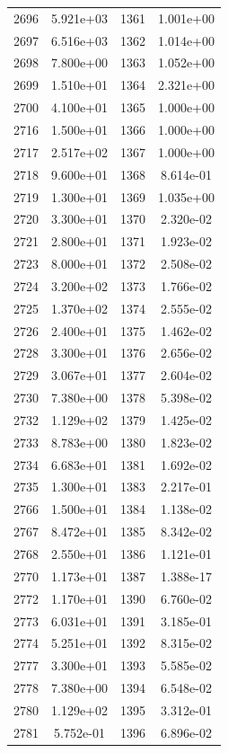 \documentclass[12pt]{article}
\begin{document}
\begin{longtable}{@{}cccc@{}}
2696 & 5.921e+03 & 1361 & 1.001e+00 \\
2697 & 6.516e+03 & 1362 & 1.014e+00 \\
2698 & 7.800e+00 & 1363 & 1.052e+00 \\
2699 & 1.510e+01 & 1364 & 2.321e+00 \\
2700 & 4.100e+01 & 1365 & 1.000e+00 \\
2716 & 1.500e+01 & 1366 & 1.000e+00 \\
2717 & 2.517e+02 & 1367 & 1.000e+00 \\
2718 & 9.600e+01 & 1368 & 8.614e-01 \\
2719 & 1.300e+01 & 1369 & 1.035e+00 \\
2720 & 3.300e+01 & 1370 & 2.320e-02 \\
2721 & 2.800e+01 & 1371 & 1.923e-02 \\
2723 & 8.000e+01 & 1372 & 2.508e-02 \\
2724 & 3.200e+02 & 1373 & 1.766e-02 \\
2725 & 1.370e+02 & 1374 & 2.555e-02 \\
2726 & 2.400e+01 & 1375 & 1.462e-02 \\
2728 & 3.300e+01 & 1376 & 2.656e-02 \\
2729 & 3.067e+01 & 1377 & 2.604e-02 \\
2730 & 7.380e+00 & 1378 & 5.398e-02 \\
2732 & 1.129e+02 & 1379 & 1.425e-02 \\
2733 & 8.783e+00 & 1380 & 1.823e-02 \\
2734 & 6.683e+01 & 1381 & 1.692e-02 \\
2735 & 1.300e+01 & 1383 & 2.217e-01 \\
2766 & 1.500e+01 & 1384 & 1.138e-02 \\
2767 & 8.472e+01 & 1385 & 8.342e-02 \\
2768 & 2.550e+01 & 1386 & 1.121e-01 \\
2770 & 1.173e+01 & 1387 & 1.388e-17 \\
2772 & 1.170e+01 & 1390 & 6.760e-02 \\
2773 & 6.031e+01 & 1391 & 3.185e-01 \\
2774 & 5.251e+01 & 1392 & 8.315e-02 \\
2777 & 3.300e+01 & 1393 & 5.585e-02 \\
2778 & 7.380e+00 & 1394 & 6.548e-02 \\
2780 & 1.129e+02 & 1395 & 3.312e-01 \\
2781 & 5.752e-01 & 1396 & 6.896e-02 \\

\end{longtable}
\end{document}
